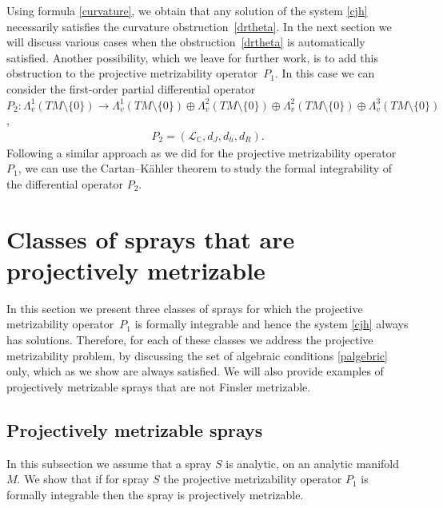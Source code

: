 \documentclass[pdftex]{sigma}
\numberwithin{equation}{section}
\begin{document}
Using formula \eqref{curvature}, we obtain that any
solution of the system \eqref{cjh} necessarily satisf\/ies the curvature
obstruction~\eqref{drtheta}. In the next section we will discuss various cases when the obstruction~\eqref{drtheta} is automatically satisf\/ied. Another possibility, which we leave for
further work, is to add this obstruction to the projective metrizability
operator~$P_1$. In this case we can consider the f\/irst-order partial dif\/ferential operator~$P_2:
\Lambda^1_v(TM\setminus\{0\}) \to \Lambda^1_v(TM\setminus\{0\})
\oplus \Lambda^2_v(TM\setminus\{0\}) \oplus
\Lambda^2_v(TM\setminus\{0\}) \oplus
\Lambda^3_v(TM\setminus\{0\}) $,
\begin{gather*}
P_2  = \left({\mathcal L}_{\mathbb C}, d_J, d_h, d_R \right).
\end{gather*}
Following a similar approach as we did for the projective
metrizability operator~$P_1$, we can use the Cartan--K\"ahler theorem to study
the formal integrability of the dif\/ferential operator $P_2$.

\section{Classes of sprays that are projectively metrizable}
\label{sec:cpm}

In this section we present three classes of sprays for which the
projective metrizability opera\-tor~$P_1$ is formally integrable and hence
the system \eqref{cjh} always has solutions. Therefore, for each of
these classes we address the projective metrizability problem, by
discussing the set of algebraic conditions \eqref{palgebric} only,
which as we show are always satisf\/ied. We
will also provide examples of projectively metrizable sprays that are
not Finsler metrizable.

\subsection{Projectively metrizable sprays} \label{subsec:pms}
In this subsection we assume that a spray $S$ is analytic, on an
analytic manifold $M$. We show that if for spray $S$ the
projective metrizability operator $P_1$ is formally integrable then the
spray is projectively metrizable.
\end{document}
